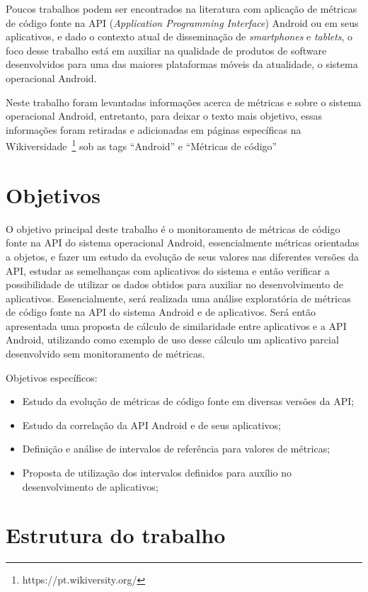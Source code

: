 Poucos trabalhos podem ser encontrados na literatura com aplicação de métricas de código fonte na API (\textit{Application Programming Interface}) Android ou em seus aplicativos, e dado o contexto atual de disseminação de \textit{smartphones} e \textit{tablets}, o foco desse trabalho está em auxiliar na qualidade de produtos de software desenvolvidos para uma das maiores plataformas móveis da atualidade, o sistema operacional Android. 

Neste trabalho foram levantadas informações acerca de métricas e sobre o sistema operacional Android, entretanto, para deixar o texto mais objetivo, essas informações foram retiradas e adicionadas em páginas específicas na Wikiversidade~\footnote{https://pt.wikiversity.org/} sob as tags ``Android'' e ``Métricas de código''

\section{Objetivos}

O objetivo principal deste trabalho é o monitoramento de métricas de código fonte na API do sistema operacional Android, essencialmente métricas orientadas a objetos, e fazer um estudo da evolução de seus valores nas diferentes versões da API, estudar as semelhanças com aplicativos do sistema e então verificar a possibilidade de utilizar os dados obtidos para auxiliar no desenvolvimento de aplicativos. Essencialmente, será realizada uma análise exploratória de métricas de código fonte na API do sistema Android e de aplicativos. Será então apresentada uma proposta de cálculo de similaridade entre aplicativos e a API Android, utilizando como exemplo de uso desse cálculo um aplicativo parcial desenvolvido sem monitoramento de métricas.

Objetivos específicos:
\begin{itemize}
\item Estudo da evolução de métricas de código fonte em diversas versões da API;
\item Estudo da correlação da API Android e de seus aplicativos;
\item Definição e análise de intervalos de referência para valores de métricas;
\item Proposta de utilização dos intervalos definidos para auxílio no desenvolvimento de aplicativos;
\end{itemize}

\section{Estrutura do trabalho}

